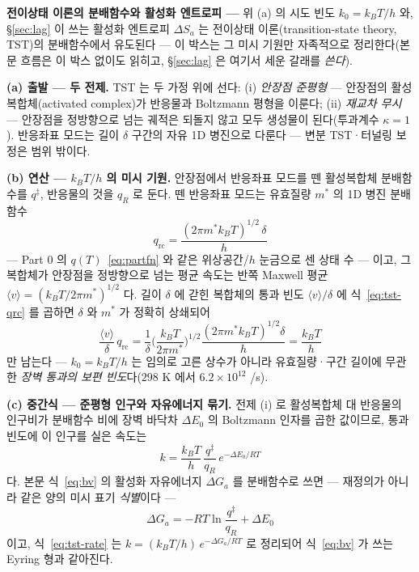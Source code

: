 \begin{bgbox}
\textbf{전이상태 이론의 분배함수와 활성화 엔트로피 ---} 위 (a) 의 시도 빈도 $k_0=k_BT/h$ 와,
\S\ref{sec:lag} 이 쓰는 활성화 엔트로피 $\Delta S_a$ 는 전이상태 이론(transition-state theory, TST)의
분배함수에서 유도된다 --- 이 박스는 그 미시 기원만 자족적으로 정리한다(본문 흐름은 이 박스 없이도 읽히고,
\S\ref{sec:lag} 은 여기서 세운 갈래를 \emph{쓴다}).

\textbf{(a) 출발 --- 두 전제.} TST 는 두 가정 위에 선다: (i) \emph{안장점 준평형} --- 안장점의
활성복합체(activated complex)가 반응물과 Boltzmann 평형을 이룬다; (ii) \emph{재교차 무시} --- 안장점을
정방향으로 넘는 궤적은 되돌지 않고 모두 생성물이 된다(투과계수 $\kappa=1$)\cite{laidlerking1983}. 반응좌표
모드는 길이 $\delta$ 구간의 자유 1D 병진으로 다룬다 --- 변분 TST·터널링 보정은 범위 밖이다.

\textbf{(b) 연산 --- $k_BT/h$ 의 미시 기원.} 안장점에서 반응좌표 모드를 뗀 활성복합체 분배함수를
$q^{\ddagger}$, 반응물의 것을 $q_R$ 로 둔다. 뗀 반응좌표 모드는 유효질량 $m^{*}$ 의 1D 병진 분배함수
\begin{equation}
q_\mathrm{rc}=\frac{(2\pi m^{*}k_BT)^{1/2}\,\delta}{h}
\label{eq:tst-qrc}
\end{equation}
--- Part 0 의 $q(T)$~\eqref{eq:partfn} 와 같은 위상공간/$h$ 눈금으로 센 상태 수 --- 이고, 그 복합체가
안장점을 정방향으로 넘는 평균 속도는 반쪽 Maxwell 평균 $\langle v\rangle=(k_BT/2\pi m^{*})^{1/2}$ 다. 길이
$\delta$ 에 갇힌 복합체의 통과 빈도 $\langle v\rangle/\delta$ 에 식~\eqref{eq:tst-qrc} 를 곱하면 $\delta$ 와
$m^{*}$ 가 정확히 상쇄되어
\begin{equation}
\frac{\langle v\rangle}{\delta}\,q_\mathrm{rc}
=\frac{1}{\delta}\Big(\frac{k_BT}{2\pi m^{*}}\Big)^{1/2}\frac{(2\pi m^{*}k_BT)^{1/2}\delta}{h}
=\frac{k_BT}{h}
\label{eq:tst-freq}
\end{equation}
만 남는다 --- $k_0=k_BT/h$ 는 임의로 고른 상수가 아니라 유효질량·구간 길이에 무관한 \emph{장벽 통과의 보편
빈도}다($298$ K 에서 $6.2\times10^{12}$ /s).

\textbf{(c) 중간식 --- 준평형 인구와 자유에너지 묶기.} 전제 (i) 로 활성복합체 대 반응물의 인구비가 분배함수
비에 장벽 바닥차 $\Delta E_0$ 의 Boltzmann 인자를 곱한 값이므로, 통과 빈도에 이 인구를 실은 속도는
\begin{equation}
k=\frac{k_BT}{h}\,\frac{q^{\ddagger}}{q_R}\,e^{-\Delta E_0/RT}
\label{eq:tst-rate}
\end{equation}
다\cite{glasstone1941,mcquarrie1976}. 본문 식~\eqref{eq:bv} 의 활성화 자유에너지 $\Delta G_a$ 를 분배함수로
쓰면 --- 재정의가 아니라 같은 양의 미시 표기 \emph{식별}이다 ---
\begin{equation}
\Delta G_a=-RT\ln\frac{q^{\ddagger}}{q_R}+\Delta E_0
\label{eq:tst-dG}
\end{equation}
이고, 식~\eqref{eq:tst-rate} 는 $k=(k_BT/h)\,e^{-\Delta G_a/RT}$ 로 정리되어 식~\eqref{eq:bv} 가 쓰는 Eyring
형과 같아진다.


\end{bgbox}
